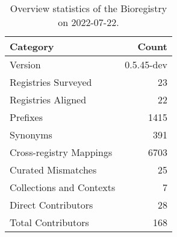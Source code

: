 \begin{table}
\centering
\caption{Overview statistics of the Bioregistry on 2022-07-22.}
\label{tab:bioregistry-summary}
\begin{tabular}{lr}
\toprule
                Category &      Count \\
\midrule
                 Version & 0.5.45-dev \\
     Registries Surveyed &         23 \\
      Registries Aligned &         22 \\
                Prefixes &       1415 \\
                Synonyms &        391 \\
 Cross-registry Mappings &       6703 \\
      Curated Mismatches &         25 \\
Collections and Contexts &          7 \\
     Direct Contributors &         28 \\
      Total Contributors &        168 \\
\bottomrule
\end{tabular}
\end{table}
